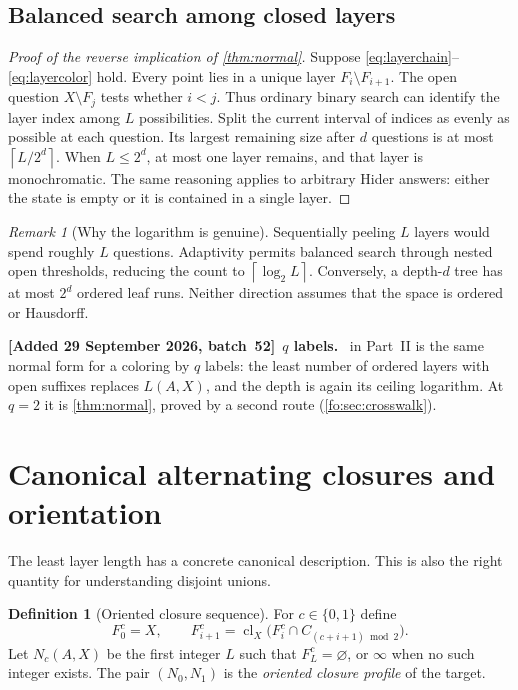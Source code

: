 \documentclass[11pt,letterpaper]{article}
\numberwithin{equation}{section}
\theoremstyle{definition}
\newtheorem{definition}[definition]{Definition}
\theoremstyle{remark}
\newtheorem{remark}[remark]{Remark}
\theoremstyle{definition}
\newcommand{\cl}{\operatorname{cl}}
\newcommand{\ceil}[1]{\left\lceil#1\right\rceil}
\newenvironment{writenote}[1][]{\par\smallskip\begingroup\small\sloppy
 \noindent\textbf{[Added 29 September 2026, batch~52]}\if\relax\detokenize{#1}\relax\else~\textbf{#1.}\fi\ }%
 {\par\endgroup\smallskip}
\begin{document}
\subsection{Balanced search among closed layers}

\begin{proof}[Proof of the reverse implication of \cref{thm:normal}]
Suppose \eqref{eq:layerchain}--\eqref{eq:layercolor} hold. Every point lies in a
unique layer $F_i\setminus F_{i+1}$. The open question $X\setminus F_j$ tests
whether $i<j$. Thus ordinary binary search can identify the layer index among
$L$ possibilities. Split the current interval of indices as evenly as possible
at each question. Its largest remaining size after $d$ questions is at most
$\ceil{L/2^d}$. When $L\leq2^d$, at most one layer remains, and that layer is
monochromatic. The same reasoning applies to arbitrary Hider answers: either
the state is empty or it is contained in a single layer.
\end{proof}

\begin{remark}[Why the logarithm is genuine]
Sequentially peeling $L$ layers would spend roughly $L$ questions. Adaptivity
permits balanced search through nested open thresholds, reducing the count to
$\ceil{\log_2 L}$. Conversely, a depth-$d$ tree has at most $2^d$ ordered leaf
runs. Neither direction assumes that the space is ordered or Hausdorff.
\end{remark}

\begin{writenote}[$q$ labels]
 in Part~II is the same normal form for a coloring by $q$
labels: the least number of ordered layers with open suffixes replaces
$L(A,X)$, and the depth is again its ceiling logarithm. At $q=2$ it is
\cref{thm:normal}, proved by a second route (\cref{fo:sec:crosswalk}).
\end{writenote}

\section{Canonical alternating closures and orientation}

The least layer length has a concrete canonical description. This is also the
right quantity for understanding disjoint unions.

\begin{definition}[Oriented closure sequence]\label{def:closure}
For $c\in\{0,1\}$ define
\begin{equation}\label{eq:greedy}
 F^c_0=X,\qquad
 F^c_{i+1}=\cl_X\bigl(F^c_i\cap C_{(c+i+1)\bmod2}\bigr).
\end{equation}
Let $N_c(A,X)$ be the first integer $L$ such that $F^c_L=\varnothing$, or
$\infty$ when no such integer exists. The pair $(N_0,N_1)$ is the
\emph{oriented closure profile} of the target.
\end{definition}
\end{document}
